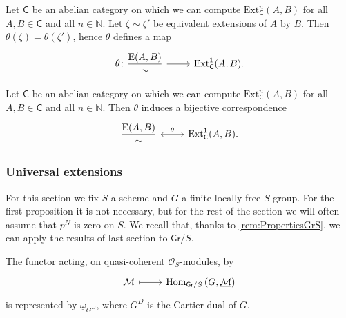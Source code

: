 \begin{lem}
	Let $\mathsf{C}$ be an abelian category on which we
	can compute $\mathrm{Ext}^n_{\mathsf{C}}(A,B)$
	for all $A, B \in \mathsf{C}$ and all $n \in \mathbb{N}$.
	Let $\zeta \sim \zeta'$ be equivalent extensions of
	$A$ by $B$.
	Then $\theta(\zeta) = \theta(\zeta')$, hence $\theta$
	defines a map
	\begin{equation*}
	\begin{tikzcd}[row sep = 0ex
		,/tikz/column 1/.append style={anchor=base east}
		,/tikz/column 2/.append style={anchor=base west}]
		\theta\colon \displaystyle{\frac{\mathrm{E}(A,B)}{\sim}} 
		\arrow[r, "", rightarrow] &
		\mathrm{Ext}^1_{\mathsf{C}}(A,B)
	.\end{tikzcd}
	\end{equation*} 
\end{lem} 


\begin{thm}\label{thm:CorrExt}
	Let $\mathsf{C}$ be an abelian category on which we
	can compute $\mathrm{Ext}^n_{\mathsf{C}}(A,B)$
	for all $A, B \in \mathsf{C}$ and all $n \in \mathbb{N}$.
	Then $\theta$ induces a bijective correspondence
	\begin{equation*}
	\begin{tikzcd}[row sep = 0ex
		,/tikz/column 1/.append style={anchor=base east}
		,/tikz/column 2/.append style={anchor=base west}]
		\displaystyle{\frac{\mathrm{E}(A,B)}{\sim}} 
		\arrow[r, "\theta", leftrightarrow] &
		\mathrm{Ext}^1_{\mathsf{C}}(A,B)
	.\end{tikzcd}
	\end{equation*} 
\end{thm} 



\subsubsection{Universal extensions}
For this section we fix $S$ a scheme and $G$ a finite locally-free $S$-group.
For the first proposition it is not necessary, but for the rest of the section we will often
assume that $p^N$ is zero on $S$.
We recall that, thanks to \cref{rem:PropertiesGrS},
we can apply the results of last section to $\mathsf{Gr}/S$.


\begin{prop}\label{prop:ReprhM}
	The functor acting, on quasi-coherent $\mathcal{O}_{ S }$-modules, by
	\begin{equation*}
	\begin{tikzcd}[row sep = 0ex
		,/tikz/column 1/.append style={anchor=base east}
		,/tikz/column 2/.append style={anchor=base west}]
		\mathcal{M} \arrow[r, "", mapsto] & 
		\mathrm{Hom}_{ \mathsf{Gr}/S } \left( G, \underline{\mathcal{M}} \right)
	\end{tikzcd}
	\end{equation*} 
	is represented by $\underline{\omega}_{G^D}$, where $G^D$ is
	the Cartier dual of $G$.
\end{prop}


